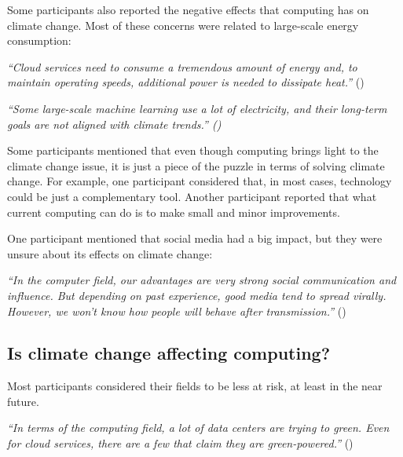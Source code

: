     Some participants also reported the negative effects that computing has on climate change. Most of these concerns were related to large-scale energy consumption:
    
    \begin{quoting}
        \textit{
        ``Cloud services need to consume a tremendous amount of energy and, to maintain operating speeds, additional power is needed to dissipate heat.''
        } ()
    \end{quoting}
    
    \begin{quoting}
        \textit{
        ``Some large-scale machine learning use a lot of electricity, and their long-term goals are not aligned with climate trends.'' ()
        }
    \end{quoting}
    
    
    Some participants mentioned that even though computing brings light to the climate change issue, it is just a piece of the puzzle in terms of solving climate change. For example, one participant considered that, in most cases, technology could be just a complementary tool. Another participant reported that what current computing can do is to make small and minor improvements. %
    
    One participant mentioned that social media had a big impact, but they were unsure about its effects on climate change:
    
    \begin{quoting}
        \textit{
        ``In the computer field, our advantages are very strong social communication and influence. But depending on past experience, good media tend to spread virally. However, we won't know how people will behave after transmission.'' 
        }()
    \end{quoting}
    
    
    
        
\subsection{Is climate change affecting computing?}

    Most participants considered their fields to be less at risk, at least in the near future.
    
    \begin{quoting}
        \textit{
        ``In terms of the computing field, a lot of data centers are trying to green. Even for cloud services, there are a few that claim they are green-powered.''
        } ()
    \end{quoting}
    
